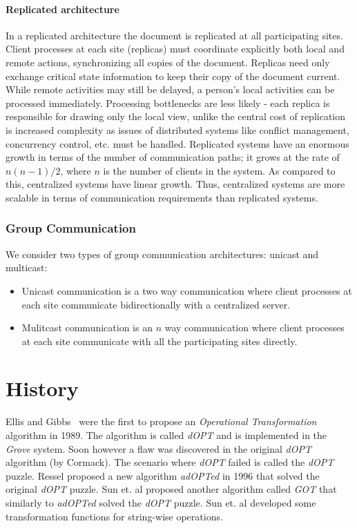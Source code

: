 \documentclass[11pt,a4paper]{article}
\begin{document}
\paragraph{Replicated architecture} In a replicated architecture the document is replicated at all participating sites. Client processes at each site (replicas) must coordinate explicitly both local and remote actions, synchronizing all copies of the document. Replicas need only exchange critical state information to keep their copy of the document current. While remote activities may still be delayed, a person's local activities can be processed immediately. Processing bottlenecks are less likely - each replica is responsible for drawing only the local view, unlike the central cost of replication is increased complexity as issues of distributed systems like conflict management, concurrency control, etc. must be handled. Replicated systems have an enormous growth in terms of the number of communication paths; it grows at the rate of $n(n-1)/2$, where $n$ is the number of clients in the system. As compared to this, centralized systems have linear growth. Thus, centralized systems are more scalable in terms of communication requirements than replicated systems.

\subsubsection{Group Communication}
We consider two types of group communication architectures: unicast and multicast:
\begin{itemize}
 \item Unicast communication is a two way communication where client processes at each site communicate bidirectionally with a centralized server.
 \item Mulitcast communication is an $n$ way communication where client processes at each site communicate with all the participating sites directly.
\end{itemize}


\section{History}
{Ellis and Gibbs}~\cite{ellis} were the first to propose an \emph{Operational Transformation} algorithm in 1989. The algorithm is called \emph{dOPT} and is implemented in the \emph{Grove} system. Soon however a flaw was discovered in the original \emph{dOPT} algorithm (by Cormack\cite{cormack95a}). The scenario where \emph{dOPT} failed is called the \emph{dOPT} puzzle. Ressel\cite{ressel96} proposed a new algorithm \emph{adOPTed} in 1996 that solved the original \emph{dOPT} puzzle. {Sun et. al}\cite{sun98a} proposed another algorithm called \emph{GOT} that similarly to \emph{adOPTed} solved the \emph{dOPT} puzzle. {Sun et. al}\cite{sun98b} developed some transformation functions for string-wise operations.
\end{document}
